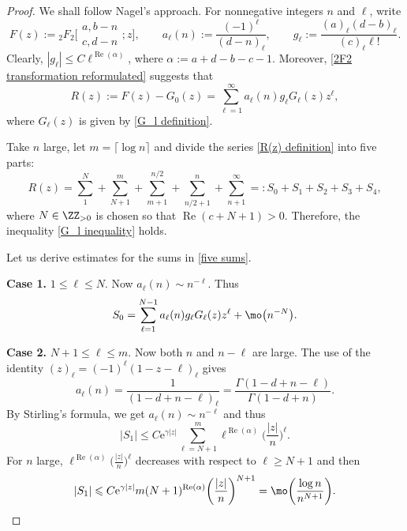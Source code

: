 \begin{proof}
	We shall follow Nagel's approach. For nonnegative integers $n$ and $\ell$, write
	\[F(z):={}_2F_2\biggl[\begin{matrix}
		a,b-n\\
		c,d-n
	\end{matrix};z\biggr],\qquad a_{\ell}(n):=\frac{(-1)^{\ell}}{(d-n)_{\ell}},\qquad g_{\ell}:=\frac{(a)_{\ell}(d-b)_{\ell}}{(c)_{\ell}\ell!}.\]
	Clearly, $\left|g_\ell\right|\leqslant C\ell^{\operatorname{Re}(\alpha)}$, where $\alpha:=a+d-b-c-1$. Moreover, \eqref{2F2 transformation reformulated} suggests that
	\begin{equation}\label{R(z) definition}
		R(z):=F(z)-G_0(z)=\sum_{\ell=1}^{\infty}a_\ell(n)g_\ell G_\ell(z)z^{\ell},
	\end{equation}
	where $G_\ell(z)$ is given by \eqref{G_l definition}.
	
	Take $n$ large, let $m=\lceil \log n\rceil$ and divide the series \eqref{R(z) definition} into five parts:
	\begin{equation}\label{five sums}
		R(z)=\sum_{1}^{N}+\sum_{N+1}^m+\sum_{m+1}^{n/2}+\sum_{n/2+1}^n+\sum_{n+1}^{\infty}=:S_0+S_1+S_2+S_3+S_4,
	\end{equation}
	where $N\in\ZZ_{>0}$ is chosen so that $\operatorname{Re}(c+N+1)>0$. Therefore, the inequality \eqref{G_l inequality} holds.
	
	Let us derive estimates for the sums in \eqref{five sums}.
	
	\textbf{Case 1.} $1\leqslant \ell\leqslant N$. Now $a_\ell(n)\sim n^{-\ell}$. Thus
	\[S_0=\sum_{\ell=1}^{N-1}a_\ell(n)g_\ell G_\ell(z)z^{\ell}+\mo\big(n^{-N}\big).\]
	
	\textbf{Case 2.} $N+1\leqslant\ell\leqslant m$. Now both $n$ and $n-\ell$ are large. The use of the identity $(z)_\ell=(-1)^{\ell}(1-z-\ell)_{\ell}$ gives
	\begin{equation}\label{a_l(n) identity}
		a_\ell(n)=\frac{1}{(1-d+n-\ell)_\ell}=\frac{\Gamma(1-d+n-\ell)}{\Gamma(1-d+n)}.
	\end{equation}
	By Stirling's formula, we get $a_\ell(n)\sim n^{-\ell}$ and thus
	\[|S_1|\leqslant C\mathrm{e}^{\gamma|z|}\sum_{\ell=N+1}^{m}\ell^{\operatorname{Re}(\alpha)}\biggl(\frac{|z|}{n}\biggr)^{\ell}.\]
	For $n$ large, $\ell^{\operatorname{Re}(\alpha)}\big(\frac{|z|}{n}\big)^{\ell}$ decreases with respect to $\ell\geqslant N+1$ and then
	\[|S_1|\leqslant C\mathrm{e}^{\gamma|z|}m(N+1)^{\operatorname{Re}(\alpha)}\biggl(\frac{|z|}{n}\biggr)^{N+1}=\mo\biggl(\frac{\log n}{n^{N+1}}\biggr).\]
	

\end{proof}
